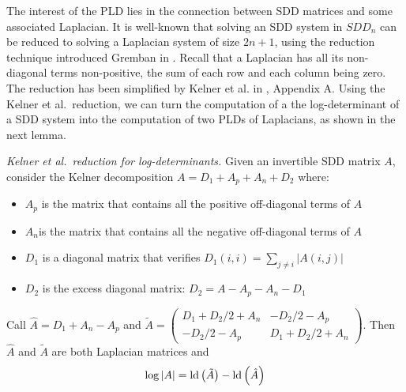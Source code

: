 The interest of the PLD lies in the connection between SDD matrices
and some associated Laplacian. It is well-known that solving an SDD
system in $SDD_{n}$ can be reduced to solving a Laplacian system
of size $2n+1$, using the reduction technique introduced Gremban
in \cite{Gremban1996}. Recall that a Laplacian has all its non-diagonal
terms non-positive, the sum of each row and each column being zero.
The reduction has been simplified by Kelner et al. in \cite{kelner2013simple},
Appendix A. Using the Kelner et al.\ reduction, we can turn the computation
of a the log-determinant of a SDD system into the computation of two
PLDs of Laplacians, as shown in the next lemma. 
\begin{lemma}
\emph{Kelner et al.\ reduction for log-determinants. }Given an invertible
SDD matrix $A$, consider the Kelner decomposition $A=D_{1}+A_{p}+A_{n}+D_{2}$
where: 
\begin{itemize}
\item $A_{p}$ is the matrix that contains all the positive off-diagonal
terms of $A$ 
\item $A_{n}$is the matrix that contains all the negative off-diagonal
terms of $A$ 
\item $D_{1}$ is a diagonal matrix that verifies $D_{1}\left(i,i\right)=\sum_{j\neq i}\left|A\left(i,j\right)\right|$ 
\item $D_{2}$ is the excess diagonal matrix: $D_{2}=A-A_{p}-A_{n}-D_{1}$ 
\end{itemize}
Call $\hat{A}=D_{1}+A_{n}-A_{p}$ and $\tilde{A}=\left(\begin{array}{cc}
D_{1}+D_{2}/2+A_{n} & -D_{2}/2-A_{p}\\
-D_{2}/2-A_{p} & D_{1}+D_{2}/2+A_{n}
\end{array}\right)$. Then $\hat{A}$ and $\tilde{A}$ are both Laplacian matrices and
\[
\log\left|A\right|=\text{\textnormal{ld}}\left(\tilde{A}\right)-\text{\textnormal{ld}}\left(\hat{A}\right)
\]
\end{lemma}
